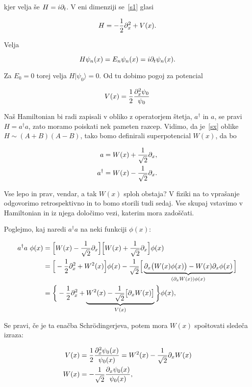 kjer velja \v se $H = i\partial_t$. V eni dimenziji se~\eqref{s1} glasi

\begin{equation}
	H = -\frac{1}{2}\partial_x^2 + V(x).
	\label{sx}
\end{equation}

Velja

\begin{equation}
	H\psi_n(x) = E_n\psi_n(x) = i\partial_t\psi_n(x).
\end{equation}

Za $E_0 = 0$ torej velja $H|\psi_0\rangle = 0$. Od tu dobimo pogoj za potencial

\begin{equation}
	V(x) = \frac{1}{2}\frac{\partial_x^2\psi_0}{\psi_0}
	\label{vpogoj}
\end{equation}

Na\v s Hamiltonian bi radi zapisali v obliko z operatorjem \v stetja, $a^\dagger$ in $a$, se pravi
$H = a^\dagger a$, zato moramo poiskati nek pameten razcep. Vidimo, da je~\eqref{sx} oblike
$H \sim (A + B)(A - B)$, tako bomo definirali superpotencial $W(x)$, da bo

\begin{align}
	a &= W(x) + \frac{1}{\sqrt{2}}\partial_x, \\
	a^\dagger &= W(x) - \frac{1}{\sqrt{2}}\partial_x.
\end{align}

Vse lepo in prav, vendar, a tak $W (x)$ sploh obstaja? V fiziki na to vpra\v sanje odgovorimo
retrospektivno in to bomo storili tudi sedaj. Vse skupaj vstavimo v Hamiltonian in iz njega dolo\v cimo
vezi, katerim mora zado\v s\v cati.

Poglejmo, kaj naredi $a^\dagger a$ na neki funkciji $\phi (x)$:

\begin{align}
	a^\dagger a\ \phi(x)&= \Big[W(x) - \frac{1}{\sqrt{2}}\partial_x\Big]\Big[W(x) +
		\frac{1}{\sqrt{2}}\partial_x\Big]\phi(x) \\
	&= \Big[-\frac{1}{2}\partial_x^2 + W^2(x)\Big]\phi(x) - \frac{1}{\sqrt{2}}\Big[
		\underbrace{\partial_x \big(W(x)\phi(x)\big) - W(x)\partial_x\phi(x)}_{(\partial_x W(x))\phi(x)} \Big] \\
	&= \bigg\{-\frac{1}{2}\partial_x^2 +
		\underbrace{W^2(x) - \frac{1}{\sqrt{2}}\big[\partial_x W(x)\big]}_{V(x)}\bigg\}\phi(x),
\end{align}

Se pravi, \v ce je ta ena\v cba Schr\" odingerjeva, potem mora $W (x)$ spo\v stovati slede\v ca izraza:

\begin{align}
	V(x) &=\frac{1}{2}\frac{\partial_x^2\psi_0(x)}{\psi_0(x)} = W^2(x) - \frac{1}{\sqrt{2}}\partial_x
		W(x) \label{riccati} \\
	W(x) &= -\frac{1}{\sqrt{2}}\frac{\partial_x\psi_0(x)}{\psi_0(x)} \label{superpotencial},
\end{align}

